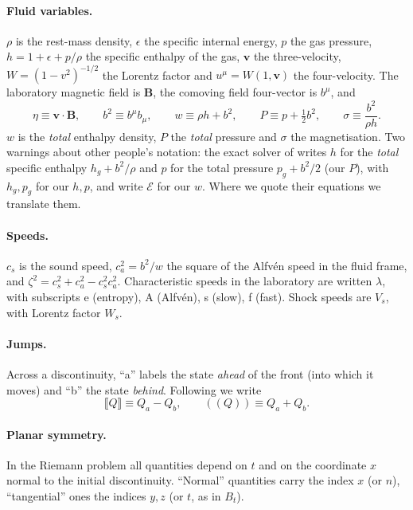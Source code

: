 \documentclass[11pt,a4paper,oneside,openany]{book}
\newcommand{\textcite}{\citet}
\theoremstyle{definition}
\theoremstyle{plain}
\theoremstyle{remark}
\newcommand{\jump}[1]{\llbracket #1\rrbracket}
\newcommand{\avg}[1]{(\!(#1)\!)}
\newcommand{\vv}{\bm{v}}
\newcommand{\BB}{\bm{B}}
\newcommand{\Ptot}{P}
\newcommand{\vB}{\eta}
\begin{document}
\paragraph{Fluid variables.} $\rho$ is the rest-mass density, $\epsilon$ the specific
internal energy, $p$ the gas pressure, $h=1+\epsilon+p/\rho$ the specific enthalpy of
the gas, $\vv$ the three-velocity, $W=(1-v^2)^{-1/2}$ the Lorentz factor and
$u^\mu=W(1,\vv)$ the four-velocity. The laboratory magnetic field is $\BB$, the comoving
field four-vector is $b^\mu$, and
\begin{equation*}
\vB\equiv\vv\cdot\BB,\qquad
b^2\equiv b^\mu b_\mu,\qquad
w\equiv\rho h+b^2,\qquad
\Ptot\equiv p+\tfrac12 b^2,\qquad
\sigma\equiv \frac{b^2}{\rho h}.
\end{equation*}
$w$ is the \emph{total} enthalpy density, $\Ptot$ the \emph{total} pressure and
$\sigma$ the magnetisation. Two warnings about other people's notation: the exact solver
of \textcite{GiacomazzoRezzolla2006} writes $h$ for the \emph{total} specific enthalpy
$h_g+b^2/\rho$ and $p$ for the total pressure $p_g+b^2/2$ (our $\Ptot$), with $h_g,p_g$ for
our $h,p$, and \textcite{Anton2010} write $\mathcal{E}$ for our
$w$. Where we quote their equations we translate them.

\paragraph{Speeds.} $c_s$ is the sound speed, $c_a^2=b^2/w$ the square of the Alfvén speed
in the fluid frame, and $\zeta^2=c_s^2+c_a^2-c_s^2c_a^2$. Characteristic speeds in the
laboratory are written $\lambda$, with subscripts e (entropy), A (Alfvén), s (slow), f
(fast). Shock speeds are $V_s$, with Lorentz factor $W_s$.

\paragraph{Jumps.} Across a discontinuity, ``a'' labels the state \emph{ahead} of the
front (into which it moves) and ``b'' the state \emph{behind}. Following
\textcite{GiacomazzoRezzolla2006} we write
\begin{equation*}
\jump{Q}\equiv Q_a-Q_b,\qquad \avg{Q}\equiv Q_a+Q_b .
\end{equation*}

\paragraph{Planar symmetry.} In the Riemann problem all quantities depend on $t$ and on
the coordinate $x$ normal to the initial discontinuity. ``Normal'' quantities carry the
index $x$ (or $n$), ``tangential'' ones the indices $y,z$ (or $t$, as in $B_t$).
\end{document}
